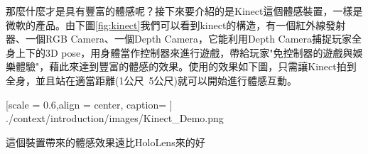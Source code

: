 那麼什麼才是具有豐富的體感呢？接下來要介紹的是Kinect這個體感裝置，一樣是微軟的產品。由下圖\ref{fig:kinect}我們可以看到kinect的構造，有一個紅外線發射器、一個RGB Camera、一個Depth Camera，它能利用Depth Camera捕捉玩家全身上下的3D pose，用身體當作控制器來進行遊戲，帶給玩家"免控制器的遊戲與娛樂體驗"，藉此來達到豐富的體感的效果。使用的效果如下圖，只需讓Kinect拍到全身，並且站在適當距離(1公尺~5公尺)就可以開始進行體感互動。

%
{   
	[scale = 0.6,align = center, caption={ } ]
	{./context/introduction/images/Kinect_Demo.png}
}%

這個裝置帶來的體感效果遠比HoloLens來的好

\EndChapter
